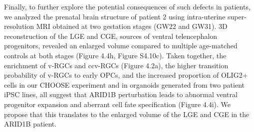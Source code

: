 Finally, to further explore the potential consequences of such defects in patients, we analyzed the prenatal brain structure of patient 2 using intra-uterine super-resolution MRI obtained at two gestation stages (GW22 and GW31). 3D reconstruction of the LGE and CGE, sources of ventral telencephalon progenitors, revealed an enlarged volume compared to multiple age-matched controls at both stages (Figure 4.4h, Figure S4.10c). Taken together, the enrichment of v-RGCs and ccv-RGCs (Figure 4.2a), the higher transition probability of v-RGCs to early OPCs, and the increased proportion of OLIG2+ cells in our CHOOSE experiment and in organoids generated from two patient iPSC lines, all suggest that ARID1B perturbation leads to abnormal ventral progenitor expansion and aberrant cell fate specification (Figure 4.4i). We propose that this translates to the enlarged volume of the LGE and CGE in the ARID1B patient.


